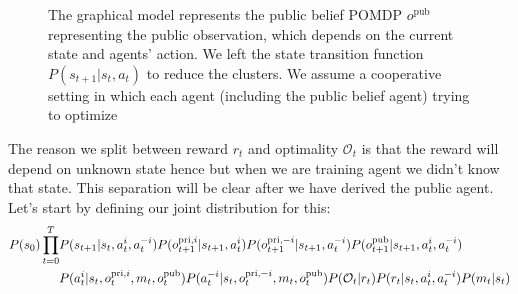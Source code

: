 \begin{figure}[h]
\begin{minipage}[t]{0.5\linewidth}
    \end{minipage}%
    \begin{minipage}[t]{0.5\linewidth}
    \caption{The graphical model represents the public belief POMDP $o^{\operatorname{pub}}$ representing the public observation, which depends on the current state and agents' action. We left the state transition function $P(s_{t+1} | s_t, a_t)$ to reduce the clusters. We assume a cooperative setting in which each agent (including the public belief agent) trying to optimize}
    \label{fig:chap4-public-belief-MARL}
    \end{minipage}
\end{figure}
The reason we split between reward $r_t$ and optimality $\mathcal{O}_t$ is that the reward will depend on unknown state hence but when we are training agent we didn't know that state. This separation will be clear after we have derived the public agent. Let's start by defining our joint distribution for this:
\begin{equation}
\label{eqn:elbo-pub-belief}
\begin{aligned}
    P(s_0)  \prod^T_{t=0} &P(s_{t+1} | s_t, a_t^i, a_t^{-i}) P(o^{\operatorname{pri}, i}_{t+1} | s_{t+1}, a^i_t) P(o^{\operatorname{pri}, -i}_{t+1} | s_{t+1}, a^{-i}_t) P(o^{\operatorname{pub}}_{t+1} | s_{t+1}, a^i_t, a^{-i}_t) \\
    &P(a^i_t | s_t, o^{\operatorname{pri}, i}_t, m_t, o^{\operatorname{pub}}_t) P(a^{-i}_t | s_t, o^{\operatorname{pri}, -i}_t, m_t, o^{\operatorname{pub}}_t) P(\mathcal{O}_t| r_t) P(r_t | s_t, a^i_t, a^{-i}_t) P(m_t | s_t)
\end{aligned}
\end{equation}
